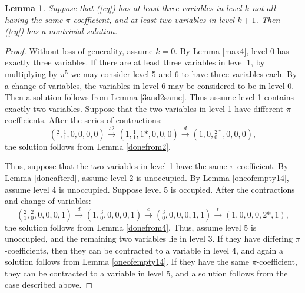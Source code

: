 \documentclass[draft]{publmathdeb}
\newtheorem{lemma}{Lemma}
\begin{document}
\begin{lemma} \label{3diffthen2}
Suppose that (\ref{eq}) has at least three variables in level $k$ not all having the same $\pi$-coefficient, and at least two variables in level $k+1$.  Then (\ref{eq}) has a nontrivial solution.
\end{lemma}
\begin{proof}
Without loss of generality, assume $k=0$.  By Lemma \ref{max4}, level 0 has exactly three variables.  If there are at least three variables in level 1, by multiplying by $\pi^5$ we may consider level 5 and 6 to have three variables each.  By a change of variables, the variables in level 6 may be considered to be in level 0.  Then a solution follows from Lemma \ref{3and2same}.  Thus assume level 1 contains exactly two variables. Suppose that the two variables in level 1 have different $\pi$-coefficients.  After the series of contractions:
$$({}^{2}_{1},{}^{1}_{1},0,0,0,0) \xrightarrow{s2} (1,{}^{1}_{1},1*,0,0,0) \xrightarrow{d} (1,0,{}^{2*}_{0},0,0,0),$$
the solution follows from Lemma \ref{donefrom2}.

Thus, suppose that the two variables in level 1 have the same $\pi$-coefficient.  By Lemma \ref{doneafterd}, assume level 2 is unoccupied.  By Lemma \ref{oneofempty14}, assume level 4 is unoccupied.  Suppose level 5 is occupied.  After the contractions and change of variables:
$$({}^{2}_{1},{}^{2}_{0},0,0,0,1) \xrightarrow{d} (1,{}^{3}_{0},0,0,0,1) \xrightarrow{c}
({}^{3}_{0},0,0,0,1,1) \xrightarrow{t}
(1,0,0,0,2*,1),$$
the solution follows from Lemma \ref{donefrom4}.  Thus, assume level 5 is unoccupied, and the remaining two variables lie in level 3.  If they have differing $\pi$-coefficients, then they can be contracted to a variable in level 4, and again a solution follows from Lemma \ref{oneofempty14}.  If they have the same $\pi$-coefficient, they can be contracted to a variable in level 5, and a solution follows from the case described above.
\end{proof}
\end{document}
